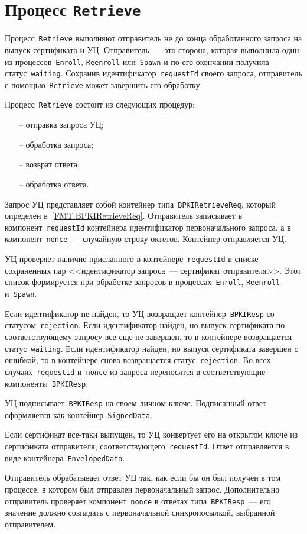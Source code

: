 \section{Процесс \texttt{Retrieve}}\label{PROCESSES.Retrieve}

Процесс~\texttt{Retrieve} выполняют отправитель не до конца обработанного
запроса на выпуск сертификата и УЦ.  Отправитель~--- это сторона, которая 
выполнила один из процессов~\texttt{Enroll}, \texttt{Reenroll} 
или~\texttt{Spawn} и по его окончании получила статус~\texttt{waiting}. 
Сохранив идентификатор~\texttt{requestId} своего запроса, отправитель с 
помощью~\texttt{Retrieve} может завершить его обработку.

Процесс~\texttt{Retrieve} состоит из следующих процедур:
\begin{itemize}
\item[--]
отправка запроса УЦ;
\item[--]
обработка запроса;
\item[--]
возврат ответа;
\item[--]
обработка ответа.
\end{itemize}

Запрос УЦ представляет собой контейнер типа~\texttt{BPKIRetrieveReq},
который определен в~\ref{FMT.BPKIRetrieveReq}.
Отправитель записывает в компонент~\texttt{requestId} контейнера
идентификатор первоначального запроса, а в компонент~\texttt{nonce}~---
случайную строку октетов. Контейнер отправляется УЦ.

УЦ проверяет наличие присланного в контейнере~\texttt{requestId} в списке 
сохраненных пар <<идентификатор запроса~--- сертификат отправителя>>. Этот 
список формируется при обработке запросов в процессах~\texttt{Enroll}, 
\texttt{Reenroll} и~\texttt{Spawn}. 

Если идентификатор не найден, то УЦ возвращает контейнер~\texttt{BPKIResp}
со статусом~\texttt{rejection}. 
%
Если идентификатор найден, но выпуск сертификата по соответствующему 
запросу все еще не завершен, то в контейнере возвращается 
статус~\texttt{waiting}.  
%
Если идентификатор найден, но выпуск сертификата завершен с ошибкой,
то в контейнере снова возвращается статус~\texttt{rejection}. 
%
Во всех случаях~\texttt{requestId} и~\texttt{nonce} из запроса переносятся 
в соответствующие компоненты~\texttt{BPKIResp}. 

УЦ подписывает~\texttt{BPKIResp} на своем личном ключе. Подписанный ответ 
оформляется как контейнер~\texttt{SignedData}.

Если сертификат все-таки выпущен, то УЦ конвертует его 
на открытом ключе из сертификата отправителя, 
соответствующего~\texttt{requestId}. Ответ отправляется
в виде контейнера~\texttt{EnvelopedData}.

Отправитель обрабатывает ответ УЦ так, как если бы он был получен в 
том процессе, в котором был отправлен первоначальный запрос.
Дополнительно отправитель проверяет компонент~\texttt{nonce}
в ответах типа~\texttt{BPKIResp}~--- его значение должно совпадать 
с первоначальной синхропосылкой, выбранной отправителем.

